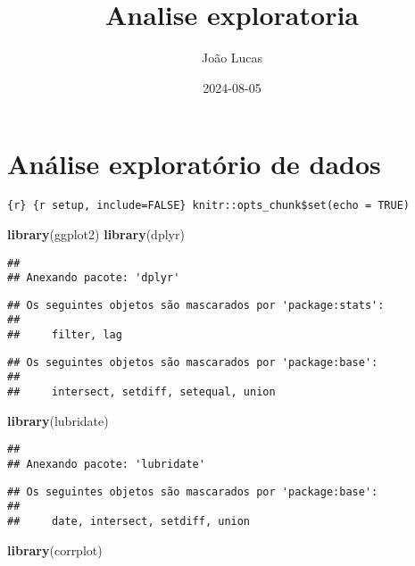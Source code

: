\documentclass[
]{article}
\title{Analise exploratoria}
\author{João Lucas}
\date{2024-08-05}
\newenvironment{Shaded}{\begin{snugshade}}{\end{snugshade}}
\newcommand{\FunctionTok}[1]{\textcolor[rgb]{0.13,0.29,0.53}{\textbf{#1}}}
\newcommand{\NormalTok}[1]{#1}
\begin{document}
\maketitle

\section{Análise exploratório de
dados}\label{anuxe1lise-exploratuxf3rio-de-dados}

\texttt{\{r\}\ \{r\ setup,\ include=FALSE\}\ knitr::opts\_chunk\$set(echo\ =\ TRUE)}

\begin{Shaded}
\begin{Highlighting}[]
\FunctionTok{library}\NormalTok{(ggplot2)}
\FunctionTok{library}\NormalTok{(dplyr)}
\end{Highlighting}
\end{Shaded}

\begin{verbatim}
## 
## Anexando pacote: 'dplyr'
\end{verbatim}

\begin{verbatim}
## Os seguintes objetos são mascarados por 'package:stats':
## 
##     filter, lag
\end{verbatim}

\begin{verbatim}
## Os seguintes objetos são mascarados por 'package:base':
## 
##     intersect, setdiff, setequal, union
\end{verbatim}

\begin{Shaded}
\begin{Highlighting}[]
\FunctionTok{library}\NormalTok{(lubridate)}
\end{Highlighting}
\end{Shaded}

\begin{verbatim}
## 
## Anexando pacote: 'lubridate'
\end{verbatim}

\begin{verbatim}
## Os seguintes objetos são mascarados por 'package:base':
## 
##     date, intersect, setdiff, union
\end{verbatim}

\begin{Shaded}
\begin{Highlighting}[]
\FunctionTok{library}\NormalTok{(corrplot)}
\end{Highlighting}
\end{Shaded}
\end{document}
